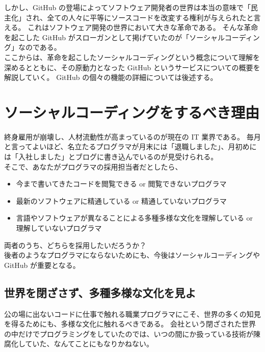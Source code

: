 しかし、GitHub の登場によってソフトウェア開発者の世界は本当の意味で「民主化」され、全ての人々に平等にソースコードを改変する権利が与えられたと言える。
これはソフトウェア開発の世界において大きな革命である。
そんな革命を起こした GitHub がスローガンとして掲げていたのが「ソーシャルコーディング」なのである。\\

ここからは、革命を起こしたソーシャルコーディングという概念について理解を深めるとともに、その原動力となった GitHub というサービスについての概要を解説していく。
GitHub の個々の機能の詳細については後述する。
\section{ソーシャルコーディングをするべき理由}
終身雇用が崩壊し、人材流動性が高まっているのが現在の IT 業界である。
毎月と言ってよいほど、名立たるプログラマが月末には「退職しました」、月初めには「入社しました」とブログに書き込んでいるのが見受けられる。\\

そこで、あなたがプログラマの採用担当者だとしたら、
\begin{itemize}\setlength{\leftskip}{-1.00zw}%
\item 今まで書いてきたコードを閲覧できる or 閲覧できないプログラマ
\item 最新のソフトウェアに精通している or 精通していないプログラマ
\item 言語やソフトウェアが異なることによる多種多様な文化を理解している or 理解していないプログラマ
\end{itemize}
両者のうち、どちらを採用したいだろうか？\\

後者のようなプログラマにならないためにも、今後はソーシャルコーディングや GitHub が重要となる。
\subsection{世界を閉ざさず、多種多様な文化を見よ}
公の場に出ないコードに仕事で触れる職業プログラマにこそ、世界の多くの知見を得るためにも、多様な文化に触れるべきである。
会社という閉ざされた世界の中だけでプログラミングをしていたのでは、いつの間にか扱っている技術が陳腐化していた、なんてことにもなりかねない。\\

